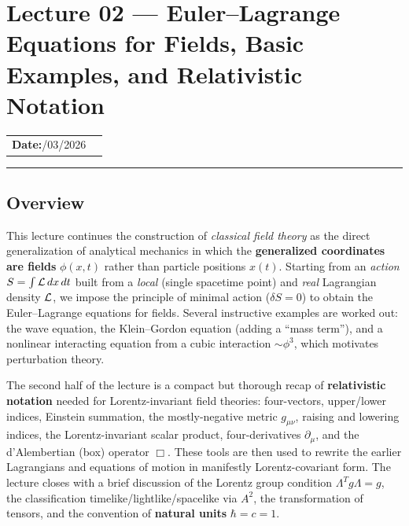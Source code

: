 
\section{Lecture 02 — Euler--Lagrange Equations for Fields, Basic
  Examples, and Relativistic Notation}\label{sec:lec02}
\begin{center}
\begin{tabular}{ll}
  \textbf{Date:}\quad 26/03/2026   & \\
\end{tabular}
\end{center}
\hrule\vspace{1.5em}
\subsection*{Overview}

This lecture continues the construction of \emph{classical field theory}
as the direct generalization of analytical mechanics in which the
\textbf{generalized coordinates are fields} \(\phi(x,t)\) rather than
particle positions \(x(t)\). Starting from an \emph{action}
\(S=\int \mathcal{L}\,dx\,dt\) built from a \emph{local} (single spacetime point)
and \emph{real} Lagrangian density \(\mathcal{L}\), we impose the principle of
minimal action (\(\delta S=0\)) to obtain the Euler--Lagrange equations
for fields. Several instructive examples are worked out: the wave
equation, the Klein--Gordon equation (adding a ``mass term''), and a
nonlinear interacting equation from a cubic interaction \(\sim\phi^3\),
which motivates perturbation theory.

The second half of the lecture is a compact but thorough recap of
\textbf{relativistic notation} needed for Lorentz-invariant field
theories: four-vectors, upper/lower indices, Einstein summation, the
mostly-negative metric \(g_{\mu\nu}\), raising and lowering indices, the
Lorentz-invariant scalar product, four-derivatives \(\partial_\mu\), and
the d'Alembertian (box) operator \(\Box\). These tools are then used to
rewrite the earlier Lagrangians and equations of motion in manifestly
Lorentz-covariant form. The lecture closes with a brief discussion of
the Lorentz group condition \(\Lambda^T g \Lambda = g\), the
classification timelike/lightlike/spacelike via \(A^2\), the
transformation of tensors, and the convention of \textbf{natural units}
\(\hbar=c=1\).

